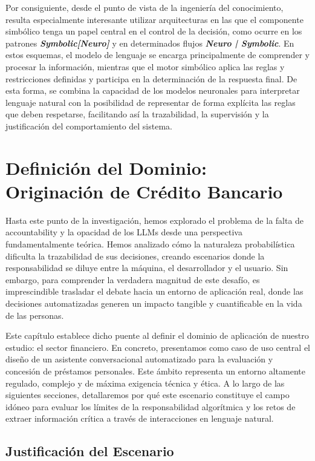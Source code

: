 \documentclass[12pt,a4paper]{report}
\begin{document}
Por consiguiente, desde el punto de vista de la ingeniería del conocimiento, resulta especialmente interesante utilizar arquitecturas en las que el componente simbólico tenga un papel central en el control de la decisión, como ocurre en los patrones \textbf{\textit{Symbolic[Neuro]}} y en determinados flujos \textbf{\textit{Neuro | Symbolic}}. En estos esquemas, el modelo de lenguaje se encarga principalmente de comprender y procesar la información, mientras que el motor simbólico aplica las reglas y restricciones definidas y participa en la determinación de la respuesta final. De esta forma, se combina la capacidad de los modelos neuronales para interpretar lenguaje natural con la posibilidad de representar de forma explícita las reglas que deben respetarse, facilitando así la trazabilidad, la supervisión y la justificación del comportamiento del sistema.

\chapter{Definición del Dominio: Originación de Crédito Bancario}

Hasta este punto de la investigación, hemos explorado el problema de la falta de accountability y la opacidad de los LLMs desde una perspectiva fundamentalmente teórica. Hemos analizado cómo la naturaleza probabilística dificulta la trazabilidad de sus decisiones, creando escenarios donde la responsabilidad se diluye entre la máquina, el desarrollador y el usuario. Sin embargo, para comprender la verdadera magnitud de este desafío, es imprescindible trasladar el debate hacia un entorno de aplicación real, donde las decisiones automatizadas generen un impacto tangible y cuantificable en la vida de las personas.

Este capítulo establece dicho puente al definir el dominio de aplicación de nuestro estudio: el sector financiero. En concreto, presentamos como caso de uso central el diseño de un asistente conversacional automatizado para la evaluación y concesión de préstamos personales. Este ámbito representa un entorno altamente regulado, complejo y de máxima exigencia técnica y ética. A lo largo de las siguientes secciones, detallaremos por qué este escenario constituye el campo idóneo para evaluar los límites de la responsabilidad algorítmica y los retos de extraer información crítica a través de interacciones en lenguaje natural.

\section{Justificación del Escenario}
\end{document}
